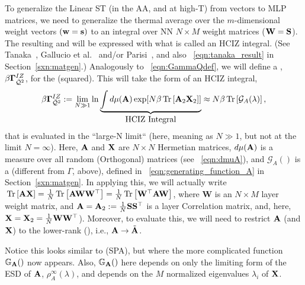 {To generalize the Linear ST \Perceptron (in the AA, and at high-T) from \Perceptron vectors to MLP matrices,
we need to generalize the thermal average over the $m$-dimensional \Perceptron weight vectors $({\mathbf{w}}={\mathbf{s}})$
to an integral over NN \Student $N \times M$ weight matrices (${\mathbf{W}}=\mathbf{S}$).
The resulting \PartitionFunction and \FreeEnergy will be expressed with what is called an HCIZ integral.
(See Tanaka~\cite{Tanaka2007, Tanaka2008}, Gallucio et al.~\cite{Bouchaud1998} and/or Parisi~\cite{PP95}, and also \EQN~\ref{eqn:tanaka_result} in Section~\ref{sxn:matgen}.)
Analogously to \EQN~\ref{eqn:GammaQdef}, we will define a \emph{\LayerQuality \GeneratingFunction}, $\beta\mathbf{\Gamma}^{IZ}_{\bar{\mathcal{Q}}^{2}}$, for the \LayerQuality (squared).
This will take the form of an HCIZ integral,
\begin{align}
\label{eqn:hciz_prelim}
\beta\mathbf{\Gamma}^{IZ}_{\bar{\mathcal{Q}}^{2}} := \lim_{N\gg 1}\ln \underbrace{\int d\mu(\mathbf{A}) \exp[N\beta\mbox{}\operatorname{Tr}\left[\mathbf{A}_{2}\mathbf{X}_{ 2}\right]] }_{\mbox{HCIZ Integral}} 
  \approx N\beta\mbox{}\operatorname{Tr}\left[\mathcal{G}_{A}(\lambda)\right]  ,
\end{align}
that is evaluated in the ``large-N limit`` (here, meaning as $N \gg 1$, but not at the limit $N=\infty$).
Here,  $\mathbf{A}$ and $\mathbf{X}$ are  $N \times N$ Hermetian matrices, $d\mu(\mathbf{A})$ is a measure
over all random (Orthogonal) matrices (see \EQN~\ref{eqn:dmuA}),
and $\mathcal{G}_{A}()$ is a \red{\GEN} 
(different from $\Gamma$, above), defined in \EQN~\ref{eqn:generating_function_A} in Section~\ref{sxn:matgen}. 
In applying this, we will actually write $\mbox{}\operatorname{Tr}\left[\mathbf{A}\mathbf{X}\right]=\tfrac{1}{N}\mbox{}\operatorname{Tr}\left[\mathbf{A}{\mathbf{W}}{\mathbf{W}}^{\top}\right]=\tfrac{1}{N}\mbox{}\operatorname{Tr}\left[{\mathbf{W}}^{\top}\mathbf{A}{\mathbf{W}}\right]$,
where $\mathbf{W}$ is an $N \times M$ layer weight matrix, and $\mathbf{A}=\mathbf{A}_{2}:=\tfrac{1}{N}{\mathbf{S}}{\mathbf{S}}^{\top}$ is a layer
Correlation matrix, and, here,  $\mathbf{X}=\mathbf{X}_2=\tfrac{1}{N}{\mathbf{W}}{\mathbf{W}}^{\top}$).
Moreover, to evaluate this, we will need to restrict $\mathbf{A}$ (and $\mathbf{X}$)
to the lower-rank \EffectiveCorrelationSpace (\ECS),  i.e., $\mathbf{A}\rightarrow\tilde{\mathbf{A}}$.

Notice this looks similar to \SaddlePointApproximation (SPA), but where the more complicated function
$\mathbb{G}_{\mathbf{A}}()$ now appears.
Also, $\mathbb{G}_{\mathbf{A}}()$ here depends on only the limiting form of the ESD of $\mathbf{A}$, $\rho^{\infty}_{A}(\lambda)$,
and depends on the $M$ normalized eigenvalues $\lambda_{i}$ of $\mathbf{X}$.

}
